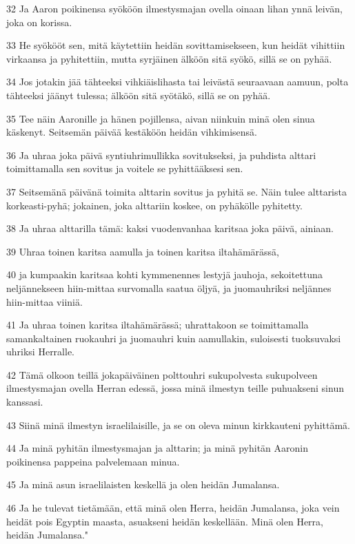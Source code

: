 \par 32 Ja Aaron poikinensa syököön ilmestysmajan ovella oinaan lihan ynnä leivän, joka on korissa.
\par 33 He syökööt sen, mitä käytettiin heidän sovittamisekseen, kun heidät vihittiin virkaansa ja pyhitettiin, mutta syrjäinen älköön sitä syökö, sillä se on pyhää.
\par 34 Jos jotakin jää tähteeksi vihkiäislihasta tai leivästä seuraavaan aamuun, polta tähteeksi jäänyt tulessa; älköön sitä syötäkö, sillä se on pyhää.
\par 35 Tee näin Aaronille ja hänen pojillensa, aivan niinkuin minä olen sinua käskenyt. Seitsemän päivää kestäköön heidän vihkimisensä.
\par 36 Ja uhraa joka päivä syntiuhrimullikka sovitukseksi, ja puhdista alttari toimittamalla sen sovitus ja voitele se pyhittääksesi sen.
\par 37 Seitsemänä päivänä toimita alttarin sovitus ja pyhitä se. Näin tulee alttarista korkeasti-pyhä; jokainen, joka alttariin koskee, on pyhäkölle pyhitetty.
\par 38 Ja uhraa alttarilla tämä: kaksi vuodenvanhaa karitsaa joka päivä, ainiaan.
\par 39 Uhraa toinen karitsa aamulla ja toinen karitsa iltahämärässä,
\par 40 ja kumpaakin karitsaa kohti kymmenennes lestyjä jauhoja, sekoitettuna neljännekseen hiin-mittaa survomalla saatua öljyä, ja juomauhriksi neljännes hiin-mittaa viiniä.
\par 41 Ja uhraa toinen karitsa iltahämärässä; uhrattakoon se toimittamalla samankaltainen ruokauhri ja juomauhri kuin aamullakin, suloisesti tuoksuvaksi uhriksi Herralle.
\par 42 Tämä olkoon teillä jokapäiväinen polttouhri sukupolvesta sukupolveen ilmestysmajan ovella Herran edessä, jossa minä ilmestyn teille puhuakseni sinun kanssasi.
\par 43 Siinä minä ilmestyn israelilaisille, ja se on oleva minun kirkkauteni pyhittämä.
\par 44 Ja minä pyhitän ilmestysmajan ja alttarin; ja minä pyhitän Aaronin poikinensa pappeina palvelemaan minua.
\par 45 Ja minä asun israelilaisten keskellä ja olen heidän Jumalansa.
\par 46 Ja he tulevat tietämään, että minä olen Herra, heidän Jumalansa, joka vein heidät pois Egyptin maasta, asuakseni heidän keskellään. Minä olen Herra, heidän Jumalansa."

